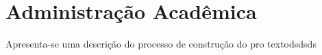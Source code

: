 \chapter{Administra{\c c}{\~a}o Acad{{\^e}mica}}
\label{cap:03} 

Apresenta-se uma descri{\c c}{\~a}o do processo de constru{\c c}{\~a}o do pro
textodsdsds